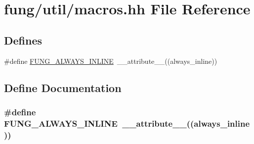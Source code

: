 \hypertarget{macros_8hh}{\section{fung/util/macros.hh \-File \-Reference}
\label{macros_8hh}
}
\subsection*{\-Defines}
\begin{DoxyCompactItemize}
\item 
\#define \hyperlink{macros_8hh_a03b9da186125795e5afa49d0ef1cc32f}{\-F\-U\-N\-G\-\_\-\-A\-L\-W\-A\-Y\-S\-\_\-\-I\-N\-L\-I\-N\-E}~\-\_\-\-\_\-attribute\-\_\-\-\_\-((always\-\_\-inline))
\end{DoxyCompactItemize}


\subsection{\-Define \-Documentation}
\hypertarget{macros_8hh_a03b9da186125795e5afa49d0ef1cc32f}{
\subsubsection[{\-F\-U\-N\-G\-\_\-\-A\-L\-W\-A\-Y\-S\-\_\-\-I\-N\-L\-I\-N\-E}]{\setlength{\rightskip}{0pt plus 5cm}\#define {\bf \-F\-U\-N\-G\-\_\-\-A\-L\-W\-A\-Y\-S\-\_\-\-I\-N\-L\-I\-N\-E}~\-\_\-\-\_\-attribute\-\_\-\-\_\-((always\-\_\-inline))}}\label{macros_8hh_a03b9da186125795e5afa49d0ef1cc32f}
